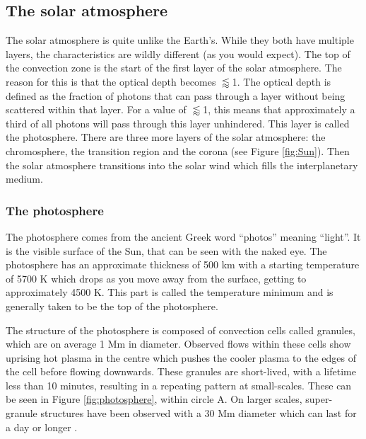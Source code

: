 \subsection{The solar atmosphere}
 
    The solar atmosphere is quite unlike the Earth's.
    While they both have multiple layers, the characteristics are wildly different (as you would expect). 
    The top of the convection zone is the start of the first layer of the solar atmosphere.
    The reason for this is that the optical depth becomes $\lessapprox$1.
    The optical depth is defined as the fraction of photons that can pass through a layer without being scattered within that layer.
    For a value of $\lessapprox$1, this means that approximately a third of all photons will pass through this layer unhindered.
    This layer is called the photosphere.
    There are three more layers of the solar atmosphere: the chromosphere, the transition region and the corona (see Figure \ref{fig:Sun}).
    Then the solar atmosphere transitions into the solar wind which fills the interplanetary medium.
    
\subsubsection{The photosphere}

    The photosphere comes from the ancient Greek word ``photos'' meaning ``light''.
    It is the visible surface of the Sun, that can be seen with the naked eye.
    The photosphere has an approximate thickness of 500 km with a starting temperature of 5700 K which drops as you move away from the surface, getting to approximately 4500 K.
    This part is called the temperature minimum and is generally taken to be the top of the photosphere.

    The structure of the photosphere is composed of convection cells called granules, which are on average 1 Mm in diameter.
    Observed flows within these cells show uprising hot plasma in the centre which pushes the cooler plasma to the edges of the cell before flowing downwards. 
    These granules are short-lived, with a lifetime less than 10 minutes, resulting in a repeating pattern at small-scales.
    These can be seen in Figure \ref{fig:photosphere}, within circle A.
    On larger scales, super-granule structures have been observed with a 30 Mm diameter which can last for a day or longer \citep{lrsp-2010-2}.
   

